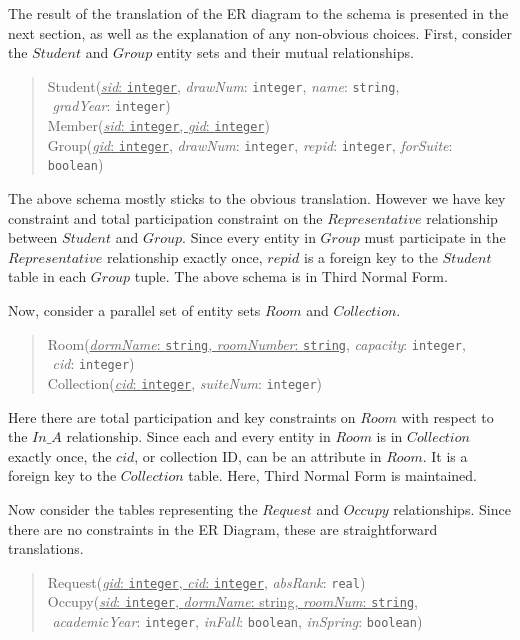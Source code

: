 \documentclass{article}
\begin{document}
The result of the translation of the ER diagram to the schema is presented in the next section, as well as the explanation of any non-obvious choices. First, consider the $Student$ and $Group$ entity sets and their mutual relationships.

\begin{quote}
  \noindent Student(\underline{\textit{sid}: \texttt{integer}}, \textit{drawNum}: \texttt{integer}, \textit{name}: \texttt{string}, \\ $\mbox{}$ \qquad \quad  \textit{gradYear}: \texttt{integer}) \\
  \noindent Member(\underline{\textit{sid}: \texttt{integer}, \textit{gid}: \texttt{integer}}) \\
  \noindent Group(\underline{\textit{gid}: \texttt{integer}}, \textit{drawNum}: \texttt{integer}, \textit{repid}: \texttt{integer}, \textit{forSuite}: \texttt{boolean})\\
\end{quote}

The above schema mostly sticks to the obvious translation.  However we have key constraint and total participation constraint on the $Representative$ relationship between $Student$ and $Group$. Since every entity in $Group$ must participate in the $Representative$ relationship exactly once, $repid$ is a foreign key to the $Student$ table in each $Group$ tuple. The above schema is in Third Normal Form.

Now, consider a parallel set of entity sets $Room$ and $Collection$.

\begin{quote}
  \noindent Room(\underline{\textit{dormName}: \texttt{string}, \textit{roomNumber}: \texttt{string}}, \textit{capacity}: \texttt{integer}, \\ $\mbox{}$ \qquad \quad \textit{cid}: \texttt{integer}) \\
  \noindent Collection(\underline{\textit{cid}: \texttt{integer}}, \textit{suiteNum}: \texttt{integer})\\
\end{quote}

Here there are total participation and key constraints on $Room$ with respect to the $In\_A$ relationship.  Since each and every entity in $Room$ is in $Collection$ exactly once, the $cid$, or collection ID, can be an attribute in $Room$. It is a foreign key to the $Collection$ table. Here, Third Normal Form is maintained.

Now consider the tables representing the $Request$ and $Occupy$ relationships. Since there are no constraints in the ER Diagram, these are straightforward translations.
\begin{quote}
  \noindent Request(\underline{\textit{gid}: \texttt{integer}, \textit{cid}: \texttt{integer}}, \textit{absRank}: \texttt{real}) \\
  \noindent Occupy(\underline{\textit{sid}: \texttt{integer}, \textit{dormName}: string, \textit{roomNum}: \texttt{string}}, \\ $\mbox{}$ \qquad \quad \textit{academicYear}: \texttt{integer}, \textit{inFall}: \texttt{boolean}, \textit{inSpring}: \texttt{boolean}) \\
\end{quote}
\end{document}
